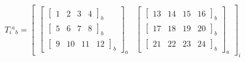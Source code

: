 \[
    T_i{}^a{}_b=
    \left[\begin{array}{cc}
            \left[\begin{array}{ccc}
                          \left[\begin{array}{NNNN}
                                  1 &
                                  2 &
                                  3 &
                                  4
                              \end{array}\right]_{b}
                          \\
                          \left[\begin{array}{NNNN}
                                  5 &
                                  6 &
                                  7 &
                                  8
                              \end{array}\right]_{b}
                          \\
                          \left[\begin{array}{NNNN}
                                  9  &
                                  10 &
                                  11 &
                                  12
                              \end{array}\right]_{b}
                      \end{array}\right]_{a}
             &
            \left[\begin{array}{ccc}
                          \left[\begin{array}{NNNN}
                                  13 &
                                  14 &
                                  15 &
                                  16
                              \end{array}\right]_{b}
                          \\
                          \left[\begin{array}{NNNN}
                                  17 &
                                  18 &
                                  19 &
                                  20
                              \end{array}\right]_{b}
                          \\
                          \left[\begin{array}{NNNN}
                                  21 &
                                  22 &
                                  23 &
                                  24
                              \end{array}\right]_{b}
                      \end{array}\right]_{a}
        \end{array}\right]_{i}
\]
